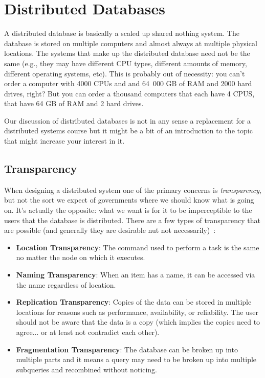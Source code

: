 




\section*{Distributed Databases}

A distributed database is basically a scaled up shared nothing system. The database is stored on multiple computers and almost always at multiple physical locations. The systems that make up the distributed database need not be the same (e.g., they may have different CPU types, different amounts of memory, different operating systems, etc). This is probably out of necessity: you can't order a computer with 4000 CPUs and and 64~000 GB of RAM and 2000 hard drives, right? But you can order a thousand computers that each have 4 CPUS, that have 64 GB of RAM and 2 hard drives.

Our discussion of distributed databases is not in any sense a replacement for a distributed systems course but it might be a bit of an introduction to the topic that might increase your interest in it. 


\subsection*{Transparency}
When designing a distributed system one of the primary concerns is \textit{transparency}, but not the sort we expect of governments where we should know what is going on. It's actually the opposite: what we want is for it to be imperceptible to the users that the database is distributed. There are a few types of transparency that are possible (and generally they are desirable nut not necessarily)~\cite{fds}:

\begin{itemize}
	\item \textbf{Location Transparency}: The command used to perform a task is the same no matter the node on which it executes.
	\item \textbf{Naming Transparency}: When an item has a name, it can be accessed via the name regardless of location.
	\item \textbf{Replication Transparency}: Copies of the data can be stored in multiple locations for reasons such as performance, availability, or reliability. The user should not be aware that the data is a copy (which implies the copies need to agree... or at least not contradict each other).
	\item \textbf{Fragmentation Transparency}: The database can be broken up into multiple parts and it means a query may need to be broken up into multiple subqueries and recombined without noticing. 
\end{itemize}

